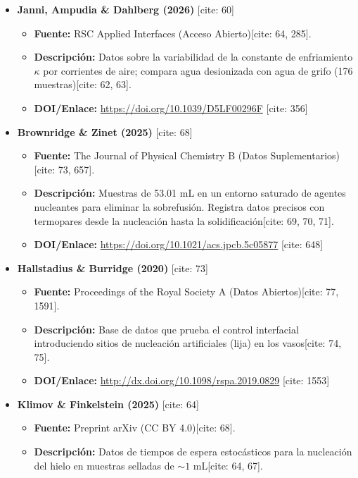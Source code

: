 \documentclass[11pt,a4paper]{article}
\begin{document}
\begin{itemize}
    \item \textbf{Janni, Ampudia \& Dahlberg (2026)} [cite: 60]
    \begin{itemize}
        \item \textbf{Fuente:} RSC Applied Interfaces (Acceso Abierto)[cite: 64, 285].
        \item \textbf{Descripción:} Datos sobre la variabilidad de la constante de enfriamiento $\kappa$ por corrientes de aire; compara agua desionizada con agua de grifo (176 muestras)[cite: 62, 63].
        \item \textbf{DOI/Enlace:} \url{https://doi.org/10.1039/D5LF00296F} [cite: 356]
    \end{itemize}
    
    \item \textbf{Brownridge \& Zinet (2025)} [cite: 68]
    \begin{itemize}
        \item \textbf{Fuente:} The Journal of Physical Chemistry B (Datos Suplementarios)[cite: 73, 657].
        \item \textbf{Descripción:} Muestras de 53.01 mL en un entorno saturado de agentes nucleantes para eliminar la sobrefusión. Registra datos precisos con termopares desde la nucleación hasta la solidificación[cite: 69, 70, 71].
        \item \textbf{DOI/Enlace:} \url{https://doi.org/10.1021/acs.jpcb.5c05877} [cite: 648]
    \end{itemize}

    \item \textbf{Hallstadius \& Burridge (2020)} [cite: 73]
    \begin{itemize}
        \item \textbf{Fuente:} Proceedings of the Royal Society A (Datos Abiertos)[cite: 77, 1591].
        \item \textbf{Descripción:} Base de datos que prueba el control interfacial introduciendo sitios de nucleación artificiales (lija) en los vasos[cite: 74, 75].
        \item \textbf{DOI/Enlace:} \url{http://dx.doi.org/10.1098/rspa.2019.0829} [cite: 1553]
    \end{itemize}

    \item \textbf{Klimov \& Finkelstein (2025)} [cite: 64]
    \begin{itemize}
        \item \textbf{Fuente:} Preprint arXiv (CC BY 4.0)[cite: 68].
        \item \textbf{Descripción:} Datos de tiempos de espera estocásticos para la nucleación del hielo en muestras selladas de $\sim 1$ mL[cite: 64, 67].
    \end{itemize}
\end{itemize}
\end{document}
